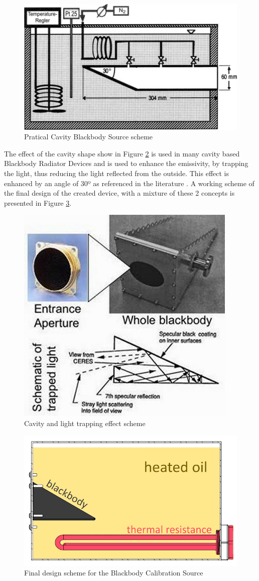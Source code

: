 \begin{figure}
\centering
\includegraphics[width=0.6\linewidth]{Figures/4.Chapter/praticalcavity.png}
\caption{Pratical Cavity Blackbody Source scheme}
\label{fig:bbs}
\end{figure}


\par The effect of the cavity shape show in Figure \ref{fig:blkbody} is used in many cavity based Blackbody Radiator Devices and is used to enhance the emissivity, by trapping the light, thus reducing the light reflected from the outside. This effect is enhanced by an angle of 30º as referenced in the literature \cite{blackbody}. A working scheme of the final design of the created device, with a mixture of these 2 concepts is presented in Figure \ref{fig:box}. \\

\begin{figure}[h]
\centering
\includegraphics[width=0.6\linewidth]{Figures/4.Chapter/blackbody3.jpg}
\caption{Cavity and light trapping effect scheme}
\label{fig:blkbody}
\end{figure}

\begin{figure}[h]
\centering
\includegraphics[width=0.6\linewidth]{Figures/4.Chapter/caixa.png}
\caption{Final design scheme for the Blackbody Calibration Source}
\label{fig:box}
\end{figure}

